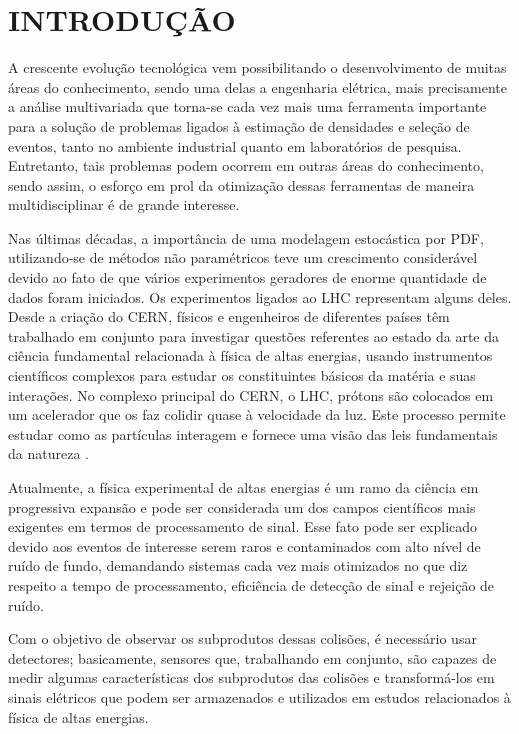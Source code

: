 \chapter{INTRODUÇÃO} \label{cap:intro}
\vspace{-2cm}
A crescente evolução tecnológica vem possibilitando o desenvolvimento de muitas áreas do conhecimento, sendo uma delas a engenharia elétrica, mais precisamente a análise multivariada \cite{vicini2005analise} que torna-se cada vez mais uma ferramenta importante para a solução de problemas ligados à estimação de densidades e seleção de eventos, tanto no ambiente industrial quanto em laboratórios de pesquisa. Entretanto, tais problemas podem ocorrem em outras áreas do conhecimento, sendo assim, o esforço em prol da otimização dessas ferramentas de maneira multidisciplinar é de grande interesse.

Nas últimas décadas, a importância de uma modelagem estocástica por \ac{PDF}, utilizando-se de métodos não paramétricos teve um crescimento considerável devido ao fato de que vários experimentos geradores de enorme quantidade de dados foram iniciados.  Os experimentos ligados ao \ac{LHC} representam alguns deles. Desde a criação do \ac{CERN}, físicos e engenheiros de diferentes países têm trabalhado em conjunto para investigar questões referentes ao estado da arte da ciência fundamental relacionada à física de altas energias, usando instrumentos científicos complexos para estudar os constituintes básicos da matéria e suas interações. No complexo principal do \ac{CERN}, o \ac{LHC}, prótons são colocados em um acelerador que os faz colidir quase à velocidade da luz. Este processo permite estudar como as partículas interagem e fornece uma visão das leis fundamentais da natureza \cite{cernwebabout}.


Atualmente, a física experimental de altas energias é um ramo da ciência em progressiva expansão e pode ser considerada um dos campos científicos mais exigentes em termos de processamento de sinal. Esse fato pode ser explicado devido aos eventos de interesse serem raros e contaminados com alto nível de ruído de fundo, demandando sistemas cada vez mais otimizados no que diz respeito a tempo de processamento, eficiência de detecção de sinal e rejeição de ruído.

Com o objetivo de observar os subprodutos dessas colisões, é necessário usar detectores; basicamente, sensores que, trabalhando em conjunto, são capazes de medir algumas características dos subprodutos das colisões e transformá-los em sinais elétricos que podem ser armazenados e utilizados em estudos relacionados à física de altas energias.

